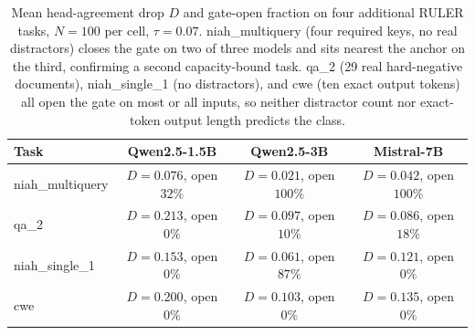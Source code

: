 \begin{table}[t]
\centering
\caption{Mean head-agreement drop $D$ and gate-open fraction on four
additional RULER tasks, $N = 100$ per cell, $\tau = 0.07$.
niah\_multiquery (four required keys, no real distractors) closes the
gate on two of three models and sits nearest the anchor on the third,
confirming a second capacity-bound task. qa\_2 (29 real hard-negative
documents), niah\_single\_1 (no distractors), and cwe (ten exact output
tokens) all open the gate on most or all inputs, so neither distractor
count nor exact-token output length predicts the class.}
\label{tab:capbound}
\begin{tabular}{lccc}
\toprule
Task & Qwen2.5-1.5B & Qwen2.5-3B & Mistral-7B \\
\midrule
niah\_multiquery & $D{=}0.076$, open $32\%$ & $D{=}0.021$, open $100\%$ & $D{=}0.042$, open $100\%$ \\
qa\_2            & $D{=}0.213$, open $0\%$  & $D{=}0.097$, open $10\%$  & $D{=}0.086$, open $18\%$  \\
niah\_single\_1  & $D{=}0.153$, open $0\%$  & $D{=}0.061$, open $87\%$  & $D{=}0.121$, open $0\%$   \\
cwe              & $D{=}0.200$, open $0\%$  & $D{=}0.103$, open $0\%$   & $D{=}0.135$, open $0\%$   \\
\bottomrule
\end{tabular}
\end{table}





\begin{table}[h]
\centering
\caption{The partition on a non-synthetic workload: three LongBench subtasks,
Qwen2.5-14B, SnapKV, $\tau = 0.07$. $D$ is the mean head-agreement drop and
``open'' the fraction of inputs on which the gate fires. ``Sensitivity'' is the
fraction of full-cache-correct answers plain eviction destroys at $b = 0.0625$
(the capacity signal) and $\rho$ the fraction of inputs on which eviction
recovers a full-cache failure (the dilution signal). The gate's class call is
made from $D$ alone, before decoding, and matches the empirical class on all
three.}
\label{tab:realistic-workload}
\end{table}

